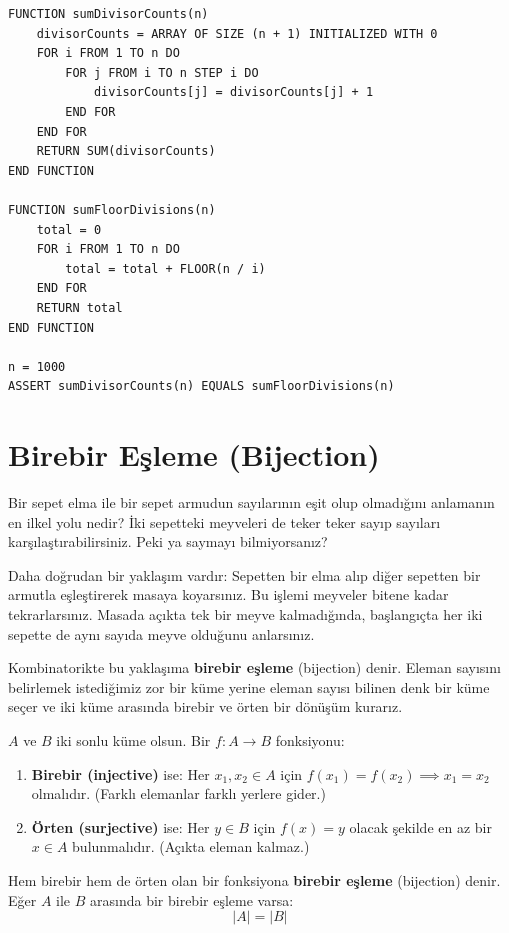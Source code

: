 \begin{lstlisting}
FUNCTION sumDivisorCounts(n)
    divisorCounts = ARRAY OF SIZE (n + 1) INITIALIZED WITH 0
    FOR i FROM 1 TO n DO
        FOR j FROM i TO n STEP i DO
            divisorCounts[j] = divisorCounts[j] + 1
        END FOR
    END FOR
    RETURN SUM(divisorCounts)
END FUNCTION

FUNCTION sumFloorDivisions(n)
    total = 0
    FOR i FROM 1 TO n DO
        total = total + FLOOR(n / i)
    END FOR
    RETURN total
END FUNCTION

n = 1000
ASSERT sumDivisorCounts(n) EQUALS sumFloorDivisions(n)\end{lstlisting}

\begin{center}
\end{center}

\section{Birebir Eşleme (Bijection)}

Bir sepet elma ile bir sepet armudun sayılarının eşit olup olmadığını anlamanın en ilkel yolu nedir? İki sepetteki meyveleri de teker teker sayıp sayıları karşılaştırabilirsiniz. Peki ya saymayı bilmiyorsanız?

Daha doğrudan bir yaklaşım vardır: Sepetten bir elma alıp diğer sepetten bir armutla eşleştirerek masaya koyarsınız. Bu işlemi meyveler bitene kadar tekrarlarsınız. Masada açıkta tek bir meyve kalmadığında, başlangıçta her iki sepette de aynı sayıda meyve olduğunu anlarsınız.

Kombinatorikte bu yaklaşıma \textbf{birebir eşleme} (bijection) denir. Eleman sayısını belirlemek istediğimiz zor bir küme yerine eleman sayısı bilinen denk bir küme seçer ve iki küme arasında birebir ve örten bir dönüşüm kurarız.

\begin{definition}
$A$ ve $B$ iki sonlu küme olsun. Bir $f: A \to B$ fonksiyonu:
\begin{enumerate}
    \item \textbf{Birebir (injective)} ise: Her $x_1, x_2 \in A$ için $f(x_1) = f(x_2) \implies x_1 = x_2$ olmalıdır. (Farklı elemanlar farklı yerlere gider.)
    \item \textbf{Örten (surjective)} ise: Her $y \in B$ için $f(x) = y$ olacak şekilde en az bir $x \in A$ bulunmalıdır. (Açıkta eleman kalmaz.)
\end{enumerate}
Hem birebir hem de örten olan bir fonksiyona \textbf{birebir eşleme} (bijection) denir. Eğer $A$ ile $B$ arasında bir birebir eşleme varsa:
\[ |A| = |B| \]
\end{definition}

